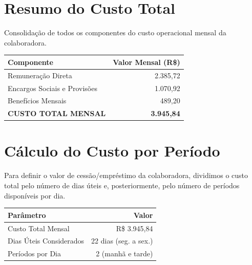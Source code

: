 \documentclass[12pt, a4paper]{article}
\newcommand{\reais}[1]{R\$ #1}
\begin{document}
\section{Resumo do Custo Total}

Consolidação de todos os componentes do custo operacional mensal da colaboradora.

\begin{table}[H]
    \centering
    \renewcommand{\arraystretch}{1.6}
    \begin{tabularx}{\textwidth}{X r}
        \toprule
        \rowcolor{tableHeader} \textbf{Componente} & \textbf{Valor Mensal (R\$)} \\
        \midrule
        Remuneração Direta & 2.385,72 \\
        \rowcolor{lightGray}
        Encargos Sociais e Provisões & 1.070,92 \\
        Benefícios Mensais & 489,20 \\
        \midrule
        \rowcolor{primaryColor!15} \textbf{CUSTO TOTAL MENSAL} & \textbf{3.945,84} \\
        \bottomrule
    \end{tabularx}
\end{table}

\section{Cálculo do Custo por Período}

Para definir o valor de cessão/empréstimo da colaboradora, dividimos o custo total pelo número de dias úteis e, posteriormente, pelo número de períodos disponíveis por dia.

\begin{table}[H]
    \centering
    \renewcommand{\arraystretch}{1.5}
    \begin{tabularx}{\textwidth}{X r}
        \toprule
        \rowcolor{tableHeader} \textbf{Parâmetro} & \textbf{Valor} \\
        \midrule
        Custo Total Mensal & \reais{3.945,84} \\
        \rowcolor{lightGray}
        Dias Úteis Considerados & 22 dias (seg. a sex.) \\
        Períodos por Dia & 2 (manhã e tarde) \\
        \bottomrule
    \end{tabularx}
\end{table}

\vspace{0.5cm}
\end{document}
